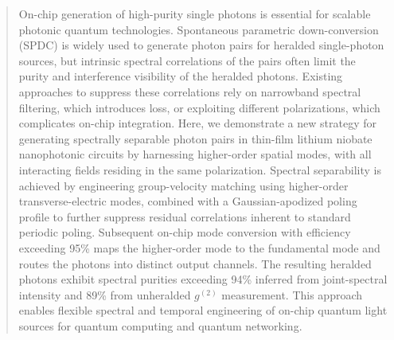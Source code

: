 \documentclass[aps, amsmath, amssymb,reprint,superscriptaddress]{revtex4-2}
\begin{document}
\author{Veerendra Dhyani}


\author{Di Zhu}




\begin{abstract}
On-chip generation of high-purity single photons is essential for scalable photonic quantum technologies. Spontaneous parametric down-conversion (SPDC) is widely used to generate photon pairs for heralded single-photon sources, but intrinsic spectral correlations of the pairs often limit the purity and interference visibility of the heralded photons. Existing approaches to suppress these correlations rely on narrowband spectral filtering, which introduces loss, or exploiting different polarizations, which complicates on-chip integration. Here, we demonstrate a new strategy for generating spectrally separable photon pairs in thin-film lithium niobate nanophotonic circuits by harnessing higher-order spatial modes, with all interacting fields residing in the same polarization. Spectral separability is achieved by engineering group-velocity matching using higher-order transverse-electric modes, combined with a Gaussian-apodized poling profile to further suppress residual correlations inherent to standard periodic poling. Subsequent on-chip mode conversion with efficiency exceeding 95\% maps the higher-order mode to the fundamental mode and routes the photons into distinct output channels. The resulting heralded photons exhibit spectral purities exceeding 94\% inferred from joint-spectral intensity and 89\% from unheralded $g^{(2)}$ measurement. This approach enables flexible spectral and temporal engineering of on-chip quantum light sources for quantum computing and quantum networking.
\end{abstract}
\end{document}
